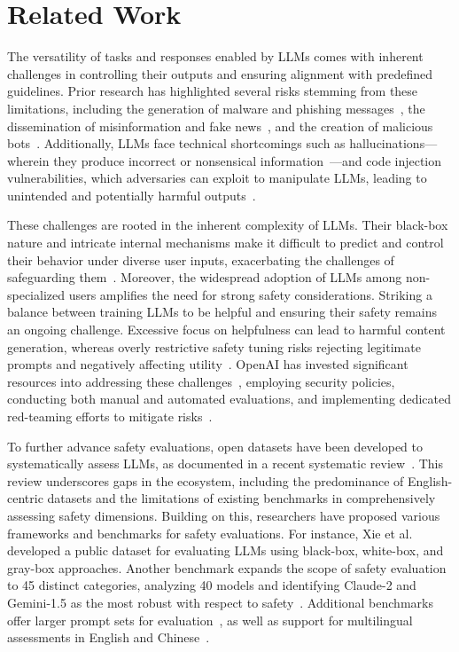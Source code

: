 \section{Related Work}
\label{Related Work}

The versatility of tasks and responses enabled by LLMs comes with inherent challenges in controlling their outputs and ensuring alignment with predefined guidelines. Prior research has highlighted several risks stemming from these limitations, including the generation of malware and phishing messages~\cite{kucharavy2024llms}, the dissemination of misinformation and fake news~\cite{Weidinger2022, Zellers2019}, and the creation of malicious bots~\cite{kucharavy2024llms, Derner2024}. Additionally, LLMs face technical shortcomings such as hallucinations—wherein they produce incorrect or nonsensical information~\cite{gao2024}—and code injection vulnerabilities, which adversaries can exploit to manipulate LLMs, leading to unintended and potentially harmful outputs~\cite{gao2024}.

These challenges are rooted in the inherent complexity of LLMs. Their black-box nature and intricate internal mechanisms make it difficult to predict and control their behavior under diverse user inputs, exacerbating the challenges of safeguarding them~\cite{sarker2024llm, ullah2024challenges}. Moreover, the widespread adoption of LLMs among non-specialized users amplifies the need for strong safety considerations. Striking a balance between training LLMs to be helpful and ensuring their safety remains an ongoing challenge. Excessive focus on helpfulness can lead to harmful content generation, whereas overly restrictive safety tuning risks rejecting legitimate prompts and negatively affecting utility~\cite{bianchi2024safety, chehbouni2024}. OpenAI has invested significant resources into addressing these challenges~\cite{openai_safety}, employing security policies, conducting both manual and automated evaluations, and implementing dedicated red-teaming efforts to mitigate risks~\cite{openai2023redteaming}.

To further advance safety evaluations, open datasets have been developed to systematically assess LLMs, as documented in a recent systematic review~\cite{rottger2025}. This review underscores gaps in the ecosystem, including the predominance of English-centric datasets and the limitations of existing benchmarks in comprehensively assessing safety dimensions. Building on this, researchers have proposed various frameworks and benchmarks for safety evaluations. For instance, Xie et al.~\cite{xie2024onlinesafety} developed a public dataset for evaluating LLMs using black-box, white-box, and gray-box approaches. Another benchmark expands the scope of safety evaluation to 45 distinct categories, analyzing 40 models and identifying Claude-2 and Gemini-1.5 as the most robust with respect to safety~\cite{xie2024sorrybench}. Additional benchmarks offer larger prompt sets for evaluation~\cite{zhang2024safetybench}, as well as support for multilingual assessments in English and Chinese~\cite{yuan2024, sun2023safety}.

